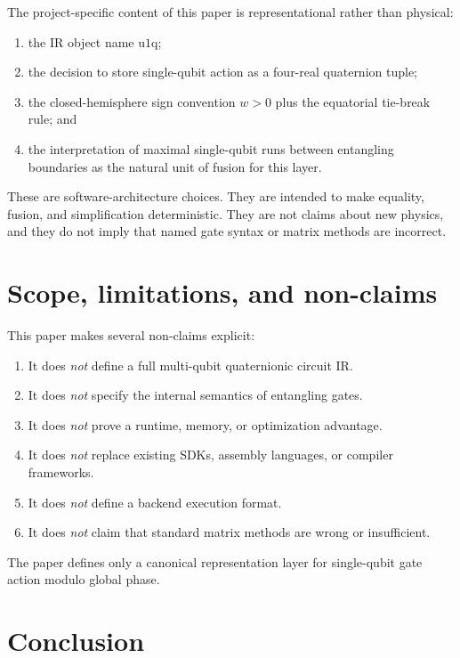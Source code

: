 \documentclass[11pt]{article}
\theoremstyle{remark}
\newcommand{\uoneq}{\mathrm{u1q}}
\begin{document}
The project-specific content of this paper is representational rather than
physical:
\begin{enumerate}[label=(\alph*), leftmargin=1.5em]
\item the IR object name $\uoneq$;
\item the decision to store single-qubit action as a four-real quaternion
tuple;
\item the closed-hemisphere sign convention $w>0$ plus the equatorial tie-break
rule; and
\item the interpretation of maximal single-qubit runs between entangling
boundaries as the natural unit of fusion for this layer.
\end{enumerate}

These are software-architecture choices. They are intended to make equality,
fusion, and simplification deterministic. They are not claims about new
physics, and they do not imply that named gate syntax or matrix methods are
incorrect.

\section{Scope, limitations, and non-claims}

This paper makes several non-claims explicit:
\begin{enumerate}[label=(\arabic*), leftmargin=1.5em]
\item It does \emph{not} define a full multi-qubit quaternionic circuit IR.
\item It does \emph{not} specify the internal semantics of entangling gates.
\item It does \emph{not} prove a runtime, memory, or optimization advantage.
\item It does \emph{not} replace existing SDKs, assembly languages, or compiler
frameworks.
\item It does \emph{not} define a backend execution format.
\item It does \emph{not} claim that standard matrix methods are wrong or
insufficient.
\end{enumerate}

The paper defines only a canonical representation layer for single-qubit gate
action modulo global phase.

\section{Conclusion}
\end{document}
